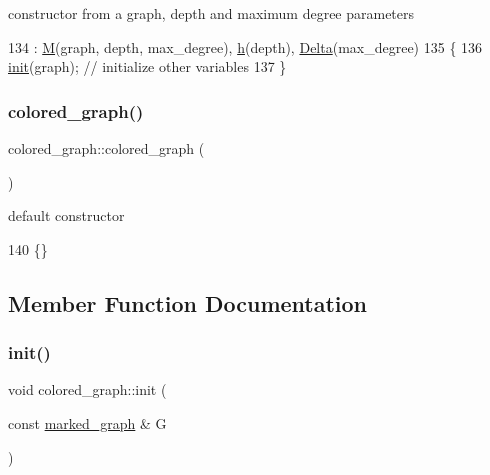 constructor from a graph, depth and maximum degree parameters 


\begin{DoxyCode}
134                                                                     : \hyperlink{classcolored__graph_ab72c568fe12f7c849ca6bffb145aec47}{M}(graph, depth, max\_degree), 
      \hyperlink{classcolored__graph_ae27062a4ee59df2670d3a0c81e85a3fa}{h}(depth), \hyperlink{classcolored__graph_a5b0e93eb40a20dc815c809dee11edc12}{Delta}(max\_degree)
135   \{
136     \hyperlink{classcolored__graph_a0e867afa9f5491dfc05bed10680f0709}{init}(graph); \textcolor{comment}{// initialize other variables }
137   \}
\end{DoxyCode}
\mbox{\label{classcolored__graph_a104bcd930e68c04e4786678923bfdca1}} 
\subsubsection{\texorpdfstring{colored\+\_\+graph()}{colored\_graph()}\hspace{0.1cm}{\footnotesize\ttfamily [2/2]}}
{\footnotesize\ttfamily colored\+\_\+graph\+::colored\+\_\+graph (\begin{DoxyParamCaption}{ }\end{DoxyParamCaption})\hspace{0.3cm}{\ttfamily [inline]}}



default constructor 


\begin{DoxyCode}
140 \{\}
\end{DoxyCode}


\subsection{Member Function Documentation}
\mbox{\label{classcolored__graph_a0e867afa9f5491dfc05bed10680f0709}} 
\subsubsection{\texorpdfstring{init()}{init()}}
{\footnotesize\ttfamily void colored\+\_\+graph\+::init (\begin{DoxyParamCaption}\item[{const \hyperlink{classmarked__graph}{marked\+\_\+graph} \&}]{G }\end{DoxyParamCaption})}



